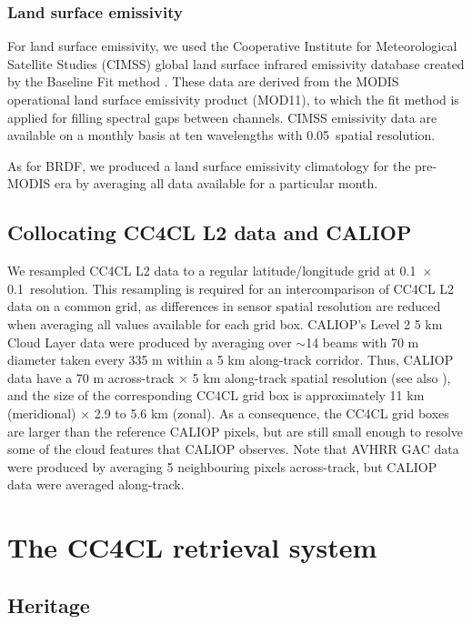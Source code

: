 \subsubsection{Land surface emissivity}\label{sec:emissivity}

For land surface emissivity, we used the Cooperative Institute for Meteorological Satellite Studies (CIMSS) global land surface infrared emissivity database created by the Baseline Fit method \citep{Seemann08}. These data are derived from the MODIS operational land surface emissivity product (MOD11), to which the fit method is applied for filling spectral gaps between channels. CIMSS emissivity data are available on a monthly basis at ten wavelengths with 0.05\textdegree\ spatial resolution.

As for BRDF, we produced a land surface emissivity climatology for the pre-MODIS era by averaging all data available for a particular month.

\subsection{Collocating CC4CL L2 data and CALIOP}

We resampled CC4CL L2 data to a regular latitude/longitude grid at 0.1\textdegree\ $\times$ 0.1\textdegree\ resolution. This resampling is required for an intercomparison of CC4CL L2 data on a common grid, as differences in sensor spatial resolution are reduced when averaging all values available for each grid box. CALIOP's Level 2 5 km Cloud Layer data were produced by averaging over $\sim$14 beams with 70 m diameter taken every 335 m within a 5 km along-track corridor. Thus, CALIOP data have a 70 m across-track $\times$ 5 km along-track spatial resolution (see also \citet{Holz08}), and the size of the corresponding CC4CL grid box is approximately 11 km (meridional) $\times$ 2.9 to 5.6 km (zonal). As a consequence, the CC4CL grid boxes are larger than the reference CALIOP pixels, but are still small enough to resolve some of the cloud features that CALIOP observes. Note that AVHRR GAC data were produced by averaging 5 neighbouring pixels across-track, but CALIOP data were averaged along-track.

\section{The CC4CL retrieval system}\label{processing_chain}

\subsection{Heritage}

